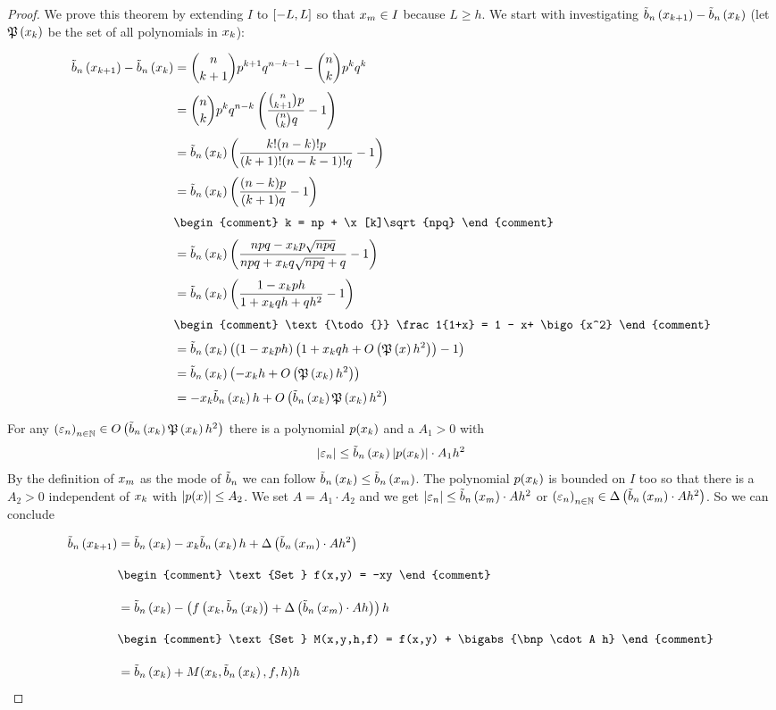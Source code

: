 \begin{proof}
  We prove this theorem by extending $I$ to $\interval{-L}{L}$ so that $\xnp \in I$ because $L \ge h$. We start with investigating $\bb{\x[k+1]}-\bb{\x[k]}$ (let $\pol{\x}$ be the set of all polynomials in $\x$):

  \begin{align}
    \bb{\x[k+1]} - \bb{\x[k]} &= \binom n{k+1} p^{k+1}q^{n-k-1} - \binom nk p^k q^k \nl
    &= \binom nk p^k q^{n-k} \br{\frac{\binom n{k+1}p}{\binom nk q} -1} \nl
    &= \bb{\x[k]} \br{\frac{k! (n-k)! p}{(k+1)!(n-k-1)! q} -1} \nl
    &= \bb{\x[k]} \br{\frac{(n-k)p}{(k+1)q}-1} \nl
    &
    \begin{comment}
      k = np + \x[k]\sqrt{npq}
    \end{comment} \nl
    &= \bb{\x[k]} \br{\frac{npq-\x[k]p\sqrt{npq}}{npq + \x[k]q\sqrt{npq}+q}-1} \nl
    &= \bb{\x[k]} \br{\frac{1-\x[k]ph}{1+\x[k]qh+qh^2}-1} \nl
    &
    \begin{comment}
      \text{\todo{}} \frac1{1+x} = 1 - x+ \bigo{x^2}
    \end{comment} \nl
    &= \bb{\x[k]} \br{\br{1-\x[k]ph}\br{1+\x[k]qh + \bigo{\pol{x}h^2}}-1} \nl
    &= \bb{\x[k]} \br{-\x[k]h + \bigo{\pol{\x}h^2}} \nl
    &= -\x[k]\bb{\x}h +  \bigo{\bb{\x[k]}\pol{\x}h^2}
  \end{align}

  For any $\seq{\epsilon_n} \in \bigo{\bb{\x[k]}\pol{\x[k]}h^2}$ there is a polynomial $p(\x[k])$ and a $A_1 > 0$ with
  \begin{align}
    \abs{\epsilon_n} \le \bb{\x[k]} \abs{p(\x[k])} \cdot A_1 h^2
  \end{align}
  By the definition of $\xnp$ as the mode of $\bbs$ we can follow $\bb{\x[k]} \le \bnp$. The polynomial $p(\x)$ is bounded on $I$ too so that there is a $A_2>0$ independent of $\x$ with $\abs{p(x)} \le A_2$. We set $A=A_1\cdot A_2$ and we get $\abs{\epsilon_n} \le \bnp \cdot A h^2$ or $\seq{\epsilon_n}\in \bigabs{\bnp \cdot A h^2}$. So we can conclude

  \begin{align}
    \bb{\x[k+1]} &= \bb{\x[k]} -\x[k]\bb{\x[k]} h + \bigabs{\bnp \cdot A h^2}\bnl
    &
    \begin{comment}
      \text{Set } f(x,y) = -xy
    \end{comment} \bnl
    &= \bb{\x[k]} - \br{\f{\x[k], \bb{\x[k]}} + \bigabs{\bnp \cdot A h}}h \bnl
    &
    \begin{comment}
      \text{Set } M(x,y,h,f) = f(x,y) + \bigabs{\bnp \cdot A h}
    \end{comment} \bnl
    &= \bb{\x[k]} + M(\x[k], \bb{\x[k]}, f, h) h
  \end{align}


\end{proof}
